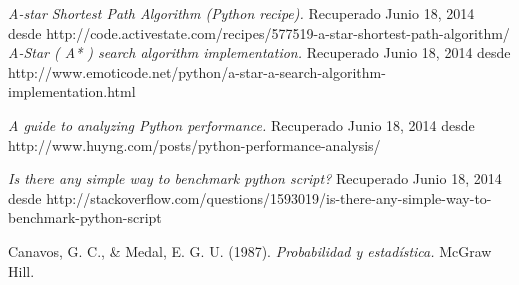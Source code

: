 \documentclass[letter, titlepage, 10pt]{article}
\begin{document}
\begin{thebibliography}{10}
     {\em A-star Shortest Path Algorithm (Python recipe).} Recuperado Junio 18, 2014 desde http://code.activestate.com/recipes/577519-a-star-shortest-path-algorithm/
     {\em A-Star ( A* ) search algorithm implementation.} Recuperado Junio 18, 2014 desde http://www.emoticode.net/python/a-star-a-search-algorithm-implementation.html

     {\em A guide to analyzing Python performance.} Recuperado Junio 18, 2014 desde http://www.huyng.com/posts/python-performance-analysis/
    
     {\em Is there any simple way to benchmark python script?} Recuperado Junio 18, 2014 desde http://stackoverflow.com/questions/1593019/is-there-any-simple-way-to-benchmark-python-script

     Canavos, G. C., \& Medal, E. G. U. (1987). {\em Probabilidad y estadística.}  McGraw Hill.

\end{thebibliography}
\end{document}
